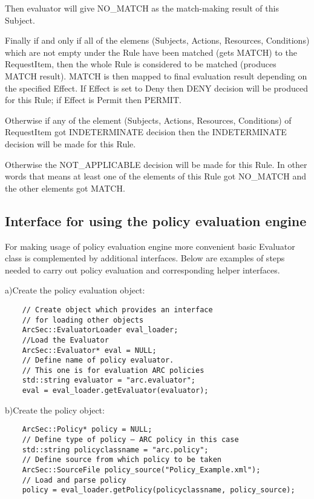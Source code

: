 \documentclass{book}
\begin{document}
Then evaluator will give NO\_MATCH as the match-making result of this Subject.

Finally if and only if all of the elemens (Subjects, Actions, Resources, Conditions) which are not empty under the Rule have been matched (gets MATCH) to the RequestItem, then the whole Rule is considered to be matched (produces MATCH result). MATCH is then mapped to final evaluation result depending on the specified Effect. If Effect is set to Deny then DENY decision will be produced for this Rule; if Effect is Permit then PERMIT.

Otherwise if any of the element (Subjects, Actions, Resources, Conditions) of RequestItem got INDETERMINATE decision then the INDETERMINATE decision will be made for this Rule.

Otherwise the NOT\_APPLICABLE decision will be made for this Rule. In other words that means at least one of the elements of this Rule got NO\_MATCH and the other elements got MATCH.

\subsection{Interface for using the policy evaluation engine} %
\label{subsec:interface_policy_engine}

For making usage of policy evaluation engine more convenient basic Evaluator class is complemented by additional interfaces. Below are examples of steps needed to carry out policy evaluation and corresponding helper interfaces.

a)Create the policy evaluation object:

\begin{verbatim}
    // Create object which provides an interface 
    // for loading other objects
    ArcSec::EvaluatorLoader eval_loader; 
    //Load the Evaluator 
    ArcSec::Evaluator* eval = NULL;
    // Define name of policy evaluator.
    // This one is for evaluation ARC policies
    std::string evaluator = "arc.evaluator"; 
    eval = eval_loader.getEvaluator(evaluator);
\end{verbatim}
b)Create the policy object:

\begin{verbatim}
    ArcSec::Policy* policy = NULL; 
    // Define type of policy – ARC policy in this case
    std::string policyclassname = "arc.policy"; 
    // Define source from which policy to be taken
    ArcSec::SourceFile policy_source("Policy_Example.xml"); 
    // Load and parse policy
    policy = eval_loader.getPolicy(policyclassname, policy_source); 
\end{verbatim}
\end{document}
